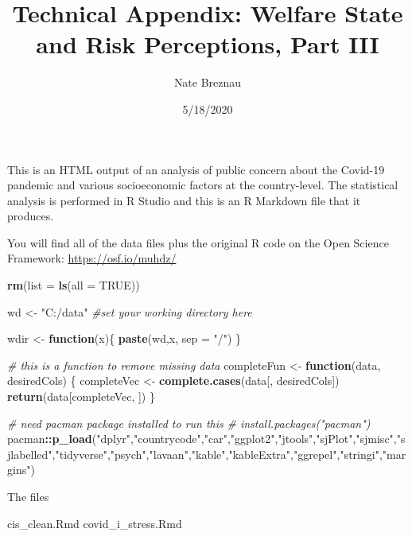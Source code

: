 \documentclass[
]{article}
\title{Technical Appendix: Welfare State and Risk Perceptions, Part III}
\author{Nate Breznau}
\date{5/18/2020}
\newenvironment{Shaded}{\begin{snugshade}}{\end{snugshade}}
\newcommand{\CommentTok}[1]{\textcolor[rgb]{0.56,0.35,0.01}{\textit{#1}}}
\newcommand{\ControlFlowTok}[1]{\textcolor[rgb]{0.13,0.29,0.53}{\textbf{#1}}}
\newcommand{\DataTypeTok}[1]{\textcolor[rgb]{0.13,0.29,0.53}{#1}}
\newcommand{\KeywordTok}[1]{\textcolor[rgb]{0.13,0.29,0.53}{\textbf{#1}}}
\newcommand{\NormalTok}[1]{#1}
\newcommand{\OperatorTok}[1]{\textcolor[rgb]{0.81,0.36,0.00}{\textbf{#1}}}
\newcommand{\OtherTok}[1]{\textcolor[rgb]{0.56,0.35,0.01}{#1}}
\newcommand{\StringTok}[1]{\textcolor[rgb]{0.31,0.60,0.02}{#1}}
\begin{document}
\maketitle

This is an HTML output of an analysis of public concern about the
Covid-19 pandemic and various socioeconomic factors at the
country-level. The statistical analysis is performed in R Studio and
this is an R Markdown file that it produces.

You will find all of the data files plus the original R code on the Open
Science Framework: \url{https://osf.io/muhdz/}

\begin{Shaded}
\begin{Highlighting}[]
\KeywordTok{rm}\NormalTok{(}\DataTypeTok{list =} \KeywordTok{ls}\NormalTok{(}\DataTypeTok{all =} \OtherTok{TRUE}\NormalTok{))}

\NormalTok{wd <-}\StringTok{ "C:/data"} \CommentTok{#set your working directory here}

\NormalTok{wdir <-}\StringTok{ }\ControlFlowTok{function}\NormalTok{(x)\{}
  \KeywordTok{paste}\NormalTok{(wd,x, }\DataTypeTok{sep =} \StringTok{"/"}\NormalTok{)}
\NormalTok{\}}


\CommentTok{# this is a function to remove missing data}
\NormalTok{completeFun <-}\StringTok{ }\ControlFlowTok{function}\NormalTok{(data, desiredCols) \{}
\NormalTok{  completeVec <-}\StringTok{ }\KeywordTok{complete.cases}\NormalTok{(data[, desiredCols])}
  \KeywordTok{return}\NormalTok{(data[completeVec, ])}
\NormalTok{\}}


\CommentTok{# need pacman package installed to run this}
\CommentTok{# install.packages("pacman")}
\NormalTok{pacman}\OperatorTok{::}\KeywordTok{p_load}\NormalTok{(}\StringTok{"dplyr"}\NormalTok{,}\StringTok{"countrycode"}\NormalTok{,}\StringTok{"car"}\NormalTok{,}\StringTok{"ggplot2"}\NormalTok{,}\StringTok{"jtools"}\NormalTok{,}\StringTok{"sjPlot"}\NormalTok{,}\StringTok{"sjmisc"}\NormalTok{,}\StringTok{"sjlabelled"}\NormalTok{,}\StringTok{"tidyverse"}\NormalTok{,}\StringTok{"psych"}\NormalTok{,}\StringTok{"lavaan"}\NormalTok{,}\StringTok{"kable"}\NormalTok{,}\StringTok{"kableExtra"}\NormalTok{,}\StringTok{"ggrepel"}\NormalTok{,}\StringTok{"stringi"}\NormalTok{,}\StringTok{"margins"}\NormalTok{)}
\end{Highlighting}
\end{Shaded}

The files

cis\_clean.Rmd covid\_i\_stress.Rmd
\end{document}
